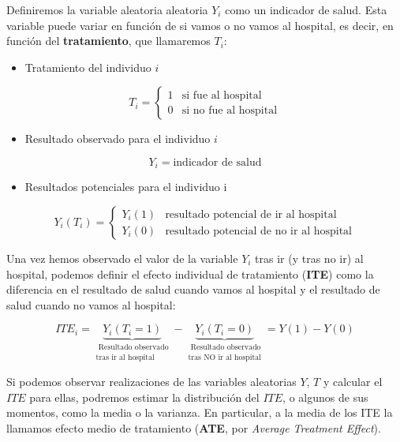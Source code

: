 \documentclass[
  a4paper,
  DIV=11,
  numbers=noendperiod]{scrreprt}
\providecommand{\tightlist}{%
  \setlength{\itemsep}{0pt}\setlength{\parskip}{0pt}}\usepackage{longtable,booktabs,array}
\begin{document}
Definiremos la variable aleatoria aleatoria \(Y_i\) como un indicador de
salud. Esta variable puede variar en función de si vamos o no vamos al
hospital, es decir, en función del \textbf{tratamiento}, que llamaremos
\(T_i\):

\begin{itemize}
\tightlist
\item
  Tratamiento del individuo \(i\)
\end{itemize}

\[
    T_i=
    \begin{cases}
      1 & \text{si fue al hospital} \\
      0 & \text{si no fue al hospital}
    \end{cases}
\]

\begin{itemize}
\tightlist
\item
  Resultado observado para el individuo \(i\)
\end{itemize}

\[ Y_i= \text{indicador de salud} \]

\begin{itemize}
\tightlist
\item
  Resultados potenciales para el individuo i
\end{itemize}

\[   Y_i(T_i) =
    \begin{cases}
      Y_i(1)  & \text{resultado potencial de ir al hospital} \\
      Y_i(0)  & \text{resultado potencial de no ir al hospital}
    \end{cases}
\]

Una vez hemos observado el valor de la variable \(Y_i\) tras ir (y tras
no ir) al hospital, podemos definir el efecto individual de tratamiento
(\textbf{ITE}) como la diferencia en el resultado de salud cuando vamos
al hospital y el resultado de salud cuando no vamos al hospital:

\[
 ITE_{i} =  \underbrace{Y_{i}(T_{i} = 1)}_{\substack{\text{ Resultado observado} \\ \text{tras ir al hospital}}}
- \underbrace{Y_{i}(T_{i} = 0)}_{\substack{\text{ Resultado observado} \\ \text{tras NO ir al hospital}}} = Y(1) - Y(0)
\]

Si podemos observar realizaciones de las variables aleatorias \(Y\),
\(T\) y calcular el \(ITE\) para ellas, podremos estimar la distribución
del \(ITE\), o algunos de sus momentos, como la media o la varianza. En
particular, a la media de los ITE la llamamos efecto medio de
tratamiento (\textbf{ATE}, por \emph{Average Treatment Effect}).
\end{document}
